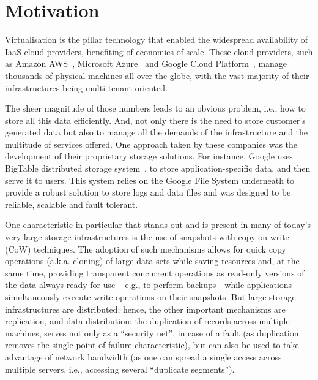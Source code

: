 \section{Motivation} %
\label{sec:intro_motivation}

Virtualisation is the pillar technology that enabled the widespread availability of IaaS cloud providers, benefiting of economies of scale. These cloud providers, such as Amazon AWS~\cite{aws_2017}, Microsoft Azure~\cite{azure_2017} and Google Cloud Platform~\cite{gcp_2017}, manage thousands of physical machines all over the globe, with the vast majority of their infrastructures being multi-tenant oriented.

The sheer magnitude of those numbers leads to an obvious problem, i.e., how to store all this data efficiently. And, not only there is the need to store customer’s generated data but also to manage all the demands of the infrastructure and the multitude of services offered. One approach taken by these companies was the development of their proprietary storage solutions. For instance, Google uses BigTable distributed storage system~\cite{Chang2006}, to store application-specific data, and then serve it to users. This system relies on the Google File System underneath to provide a robust solution to store logs and data files and was designed to be reliable, scalable and fault tolerant.

One characteristic in particular that stands out and is present in many of today’s very large storage infrastructures is the use of snapshots with copy-on-write (CoW) techniques. The adoption of such mechanisms allows for quick copy operations (a.k.a. cloning) of large data sets while saving resources and, at the same time, providing transparent concurrent operations as read-only versions of the data always ready for use – e.g., to perform backups - while applications simultaneously execute write operations on their snapshots. But large storage infrastructures are distributed; hence, the other important mechanisms are replication, and data distribution: the duplication of records across multiple machines, serves not only as a “security net”, in case of a fault (as duplication removes the single point-of-failure characteristic), but can also be used to take advantage of network bandwidth (as one can spread a single access across multiple servers, i.e., accessing several “duplicate segments”).

